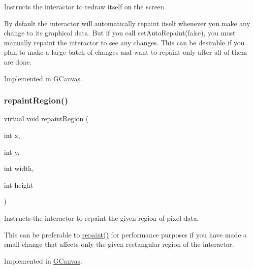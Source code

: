 Instructs the interactor to redraw itself on the screen. 

By default the interactor will automatically repaint itself whenever you make any change to its graphical data. But if you call set\+Auto\+Repaint(false), you must manually repaint the interactor to see any changes. This can be desirable if you plan to make a large batch of changes and want to repaint only after all of them are done. 

Implemented in \mbox{\hyperlink{classsgl_1_1GCanvas_afb8dbc55702230f0030e47d6c009697f}{G\+Canvas}}.

\mbox{\label{classsgl_1_1GDrawingSurface_a1a3898317080fecf8af21bbeaeeb37c3}} 
\subsubsection{\texorpdfstring{repaint\+Region()}{repaintRegion()}\hspace{0.1cm}{\footnotesize\ttfamily [1/2]}}
{\footnotesize\ttfamily virtual void repaint\+Region (\begin{DoxyParamCaption}\item[{int}]{x,  }\item[{int}]{y,  }\item[{int}]{width,  }\item[{int}]{height }\end{DoxyParamCaption})\hspace{0.3cm}{\ttfamily [pure virtual]}}



Instructs the interactor to repaint the given region of pixel data. 

This can be preferable to \mbox{\hyperlink{classsgl_1_1GDrawingSurface_a4a8ae47b42f1e6a41b65d3546df46218}{repaint()}} for performance purposes if you have made a small change that affects only the given rectangular region of the interactor. 

Implemented in \mbox{\hyperlink{classsgl_1_1GCanvas_a63af8fca5bf186367132ecf6af6f5eea}{G\+Canvas}}.

\mbox{\label{classsgl_1_1GDrawingSurface_a769c46fb3e1004aec76e8b0adfa42aa6}} 
